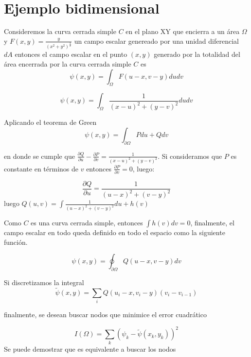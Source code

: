 
\section{Ejemplo bidimensional}

Consideremos la curva cerrada simple $C$ en el plano XY que encierra a
un área $\Omega$ y $F(x,y)=\frac{y}{\left(x^2+y^2\right)^{\frac{3}{2}}}$ un campo escalar
genereado por una unidad diferencial $dA$ entonces el campo escalar en el
punto $(x,y)$ generado por la totalidad del área encerrada por la
curva cerrada simple $C$ es
$$\psi(x,y) = \int_\Omega F(u-x,v-y)dudv$$

$$\psi(x,y) = \int_\Omega \frac{1}{(x-u)^2+(y-v)^2}dudv$$


Aplicando el teorema de Green
$$\psi(x,y) = \int_{\partial \Omega} Pdu+Qdv$$

en donde se cumple que
$\frac{\partial Q}{\partial u}-\frac{\partial P}{\partial
  v}=\frac{1}{(x-u)^2+(y-v)^2}$. Si
  consideramos que $P$ es constante en términos de $v$ entonces
  $\frac{\partial P}{\partial v}=0$, luego:

$$\frac{\partial Q}{\partial u}=\frac{1}{(u-x)^2+(v-y)^2}$$
luego $Q(u,v)=\int \frac{1}{(u-x)^2+(v-y)^2}du+h(v) $

Como $C$ es una curva cerrada simple, entonces $\int h(v)dv=0$,
finalmente, el campo escalar en todo queda definido en todo el espacio
como la siguiente función.

$$\psi(x,y)=\oint_{\partial \Omega} Q(u-x,v-y)dv$$

Si discretizamos la integral
$$\tilde \psi(x,y)=\sum_i Q(u_i-x,v_i-y)(v_{i}-v_{i-1})$$

	finalmente, se desean buscar nodos \nodes  que minimice el
error cuadrático

$$I(\Omega) = \sum_k ( \psi_k -\tilde \psi(x_k,y_k))^2$$
Se puede demostrar que es equivalente a buscar los nodos 
